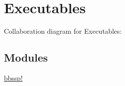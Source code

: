 \hypertarget{group___executables}{
\section{Executables}
\label{group___executables}
}


Collaboration diagram for Executables:\subsection*{Modules}
\begin{CompactItemize}
\item 
\hyperlink{group__bbssp}{bbssp!}
\end{CompactItemize}

